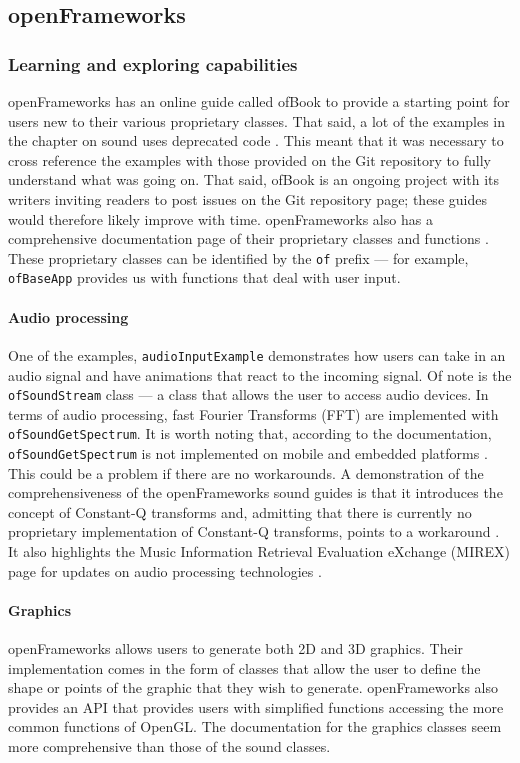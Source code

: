 \documentclass[../frameworkreview.tex]{subfiles}
\begin{document}
\subsection{openFrameworks}

\subsubsection{Learning and exploring capabilities}
openFrameworks has an online guide called ofBook to provide a starting point for users new to their various proprietary classes. That said, a lot of the examples in the chapter on sound uses deprecated code \cite{Carlucci}. This meant that it was necessary to cross reference the examples with those provided on the Git repository to fully understand what was going on. That said, ofBook is an ongoing project with its writers inviting readers to post issues on the Git repository page; these guides would therefore likely improve with time. openFrameworks also has a comprehensive documentation page of their proprietary classes and functions \cite{openFrameworks}. These proprietary classes can be identified by the \verb|of| prefix --- for example, \verb|ofBaseApp| provides us with functions that deal with user input.

\paragraph{Audio processing}
One of the examples, \verb|audioInputExample| demonstrates how users can take in an audio signal and have animations that react to the incoming signal. Of note is the \verb|ofSoundStream| class --- a class that allows the user to access audio devices. In terms of audio processing, fast Fourier Transforms (FFT) are implemented with \verb|ofSoundGetSpectrum|. It is worth noting that, according to the documentation, \verb|ofSoundGetSpectrum| is not implemented on mobile and embedded platforms \cite{OFsoundstreamFFT}. This could be a problem if there are no workarounds. A demonstration of the comprehensiveness of the openFrameworks sound guides is that it introduces the concept of Constant-Q transforms and, admitting that there is currently no proprietary implementation of Constant-Q transforms, points to a workaround \cite{Klapuri}. It also highlights the Music Information Retrieval Evaluation eXchange (MIREX) page for updates on audio processing technologies \cite{mirexWiki}.

\paragraph{Graphics}
openFrameworks allows users to generate both 2D and 3D graphics. Their implementation comes in the form of classes that allow the user to define the shape or points of the graphic that they wish to generate. openFrameworks also provides an API that provides users with simplified functions accessing the more common functions of OpenGL. The documentation for the graphics classes seem more comprehensive than those of the sound classes.
\end{document}
